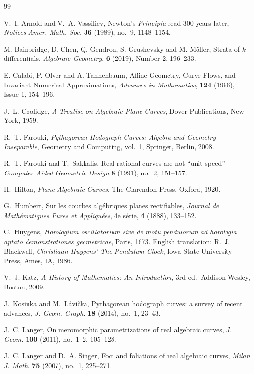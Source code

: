 \documentclass[reqno]{amsart}
\theoremstyle{definition}
\theoremstyle{remark}
\theoremstyle{definition}
\theoremstyle{definition}
\theoremstyle{definition}
\begin{document}
\begin{thebibliography}{99}

 V.~I. Arnold and V.~A. Vassiliev, Newton's \emph{Principia} read 300 years later, \emph{Notices Amer. Math. Soc.} \textbf{36} (1989), no.~9, 1148--1154.

M. Bainbridge, D. Chen, Q. Gendron, S. Grushevsky and M. Möller, Strata of $k$-differentials, \emph{Algebraic Geometry}, \textbf{6} (2019), Number 2, 196--233.

E. Calabi, P. Olver and A. Tannenbaum, Affine Geometry, Curve Flows, and Invariant Numerical Approximations,
\emph{Advances in Mathematics}, \textbf{124} (1996), Issue 1, 154--196.

 J.~L. Coolidge, \emph{A Treatise on Algebraic Plane Curves}, Dover Publications, New York, 1959.

 R.~T. Farouki, \emph{Pythagorean-Hodograph Curves: Algebra and Geometry Inseparable}, Geometry and Computing, vol.~1, Springer, Berlin, 2008.

 R.~T. Farouki and T.~Sakkalis, Real rational curves are not ``unit speed'', \emph{Computer Aided Geometric Design} \textbf{8} (1991), no.~2, 151--157.

 H.~Hilton, \emph{Plane Algebraic Curves}, The Clarendon Press, Oxford, 1920.

 G.~Humbert, Sur les courbes alg\'ebriques planes rectifiables, \emph{Journal de Math\'ematiques Pures et Appliqu\'ees}, 4e s\'erie, \textbf{4} (1888), 133--152.

 C.~Huygens, \emph{Horologium oscillatorium sive de motu pendulorum ad horologia aptato demonstrationes geometricae}, Paris, 1673. English translation: R.~J. Blackwell, \emph{Christiaan Huygens' The Pendulum Clock}, Iowa State University Press, Ames, IA, 1986.

 V.~J. Katz, \emph{A History of Mathematics: An Introduction}, 3rd ed., Addison-Wesley, Boston, 2009.

 J.~Kosinka and M.~L\'avi\v{c}ka, Pythagorean hodograph curves: a survey of recent advances, \emph{J. Geom. Graph.} \textbf{18} (2014), no.~1, 23--43.

 J.~C. Langer, On meromorphic parametrizations of real algebraic curves, \emph{J. Geom.} \textbf{100} (2011), no.~1--2, 105--128.

 J.~C. Langer and D.~A. Singer, Foci and foliations of real algebraic curves, \emph{Milan J. Math.} \textbf{75} (2007), no.~1, 225--271.


\end{thebibliography}
\end{document}
